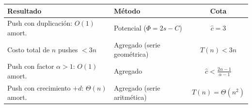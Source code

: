 \documentclass[11pt, letterpaper]{article}
\theoremstyle{definition}
\theoremstyle{plain}
\theoremstyle{remark}
\begin{document}
\begin{table}[h]
\centering
\begin{tabular}{llc}
\toprule
\textbf{Resultado} & \textbf{Método} & \textbf{Cota} \\
\midrule
Push con duplicación: $O(1)$ amort.
  & Potencial ($\Phi = 2s - C$)
  & $\hat{c} = 3$ \\
Costo total de $n$ pushes $< 3n$
  & Agregado (serie geométrica)
  & $T(n) < 3n$ \\
Push con factor $\alpha > 1$: $O(1)$ amort.
  & Agregado
  & $\hat{c} < \frac{2\alpha{-}1}{\alpha{-}1}$ \\
Push con crecimiento $+d$: $\Theta(n)$ amort.
  & Agregado (serie aritmética)
  & $T(n) = \Theta(n^2)$ \\
\bottomrule
\end{tabular}
\end{table}
\end{document}
